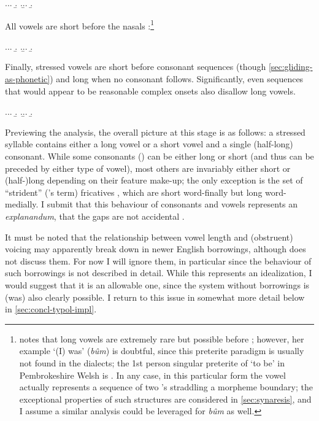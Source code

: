 \ex.\a.\a.
\b.
\z.\b.\a.
\b.


All vowels are short before the nasals \ipa{[m~ŋ]}:\footnote{\citet{welshphonotactics} notes that long vowels are extremely rare but possible before \ipa{[m]}; however, her example \ipa{[ˈbiːm]} `(I) was' (\emph{bûm}) is doubtful, since this preterite paradigm is usually not found in the dialects; the 1st person singular preterite of `to be' in Pembrokeshire Welsh is \ipa{[ˈbiːes]}. In any case, in this particular form the vowel \ipa{[iː]} actually represents a sequence of two \ipa{[i]}'s straddling a morpheme boundary; the exceptional properties of such structures are considered in \cref{sec:synaresis}, and I assume a similar analysis could be leveraged for \emph{bûm} as well.}

\ex.\a.\a.
\b.
\z.\b.\a.
\b.

Finally,  stressed vowels are short before consonant sequences (though \cf \cref{sec:gliding-as-phonetic}) and long when no consonant follows. Significantly, even sequences that would appear to be reasonable complex onsets also disallow long vowels.

\ex.\a.\a.
\b.
\z.\b.\a.
\b.

Previewing the analysis, the overall picture at this stage is as follows: a stressed syllable contains either a long vowel or a short vowel and a single (half-long) consonant. While some consonants (\ipa{[n~l~r]}) can be either long or short (and thus can be preceded by either type of vowel), most others are invariably either short or (half-)long depending on their feature make-up; the only exception is the set of \enquote{strident} (\citeauthor{awbery86:_pembr_welsh}'s term) fricatives \ipa{[s~ʃ~ɬ]}, which are short word-finally but long word-medially. I submit that this behaviour of consonants and vowels represents an \emph{explanandum}, \ie that the gaps are not accidental \citep[following][]{wells79:_final_welsh}.

It must be noted that the relationship between vowel length and (obstruent) voicing may apparently break down in newer English borrowings, although \citet{awbery86:_pembr_welsh} does not discuss them. For now I will ignore them, in particular since the behaviour of such borrowings is not described in detail. While this represents an idealization, I would suggest that it is an allowable one, since the system without borrowings is (was) also clearly possible. I return to this issue in somewhat more detail below in \cref{sec:concl-typol-impl}.



